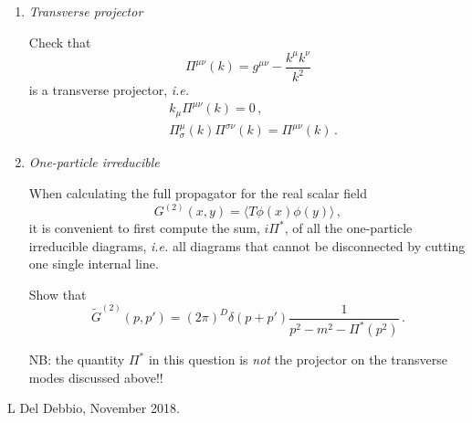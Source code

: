 \documentclass[12pt,a4paper]{article}
\newcommand{\munu}{{\mu\nu}}
\begin{document}
\begin{enumerate}
    \bigskip
    
    \item {\it Transverse projector}
      
      Check that 
      \[
      \Pi^\munu(k) = g^\munu - \frac{k^\mu k^\nu}{k^2}
      \]
      is a transverse projector, {\em i.e.}
      \begin{align*}
        & k_\mu \Pi^\munu(k) =  0 \, , \\
        & \Pi^\mu_\sigma(k) \Pi^{\sigma\nu}(k) = \Pi^\munu(k) \, .
      \end{align*}
      
      \bigskip

    \item {\it One-particle irreducible}

      When calculating the full propagator for the real scalar field
      \[
      G^{(2)}(x,y) = \langle T \phi(x) \phi(y) \rangle\, ,
      \]
      it is convenient to first compute the sum, $i\Pi^*$, of all the
      one-particle irreducible diagrams, {\em i.e.} all diagrams that
      cannot be disconnected by cutting one single internal line. 
 
      Show that 
      \[
      \tilde{G}^{(2)}(p,p') = (2\pi)^D \delta(p+p')
      \frac{1}{p^2-m^2-\Pi^*(p^2)}\, .
      \]
      
      NB: the quantity $\Pi^*$ in this question is {\em not} the
      projector on the transverse modes discussed above!!

\end{enumerate}

\vfill
\hspace*{\fill}\tiny L Del Debbio, November 2018.
\end{document}
